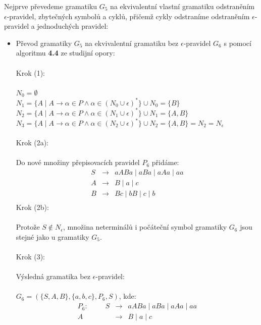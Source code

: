 \documentclass[a4paper,11pt]{article}[24.3.2010]
\begin{document}
\begin{enumerate}
Nejprve převedeme gramatiku  $G_{5}$ na ekvivalentní vlastní gramatiku odstraněním $\epsilon$-pravidel, zbytečných symbolů a cyklů, přičemž cykly odstraníme odstraněním $\epsilon$-pravidel a jednoduchých pravidel:
    \begin{itemize}
      \item Převod gramatiky $G_{5}$ na ekvivalentní gramatiku bez $\epsilon$-pravidel $G_{6}$ s pomocí algoritmu \textbf{4.4} ze studijní opory:\\\\
      Krok (1):\\\\
      $N_{0} = \emptyset$\\
      $N_{1} = \{A \mid A \rightarrow \alpha \in P \wedge \alpha \in (N_{0} \cup \epsilon)^{*}\} \cup N_{0} = \{B\}$\\
      $N_{2} = \{A \mid A \rightarrow \alpha \in P \wedge \alpha \in (N_{1} \cup \epsilon)^{*}\} \cup N_{1} = \{A,B\}$\\
      $N_{3} = \{A \mid A \rightarrow \alpha \in P \wedge \alpha \in (N_{2} \cup \epsilon)^{*}\} \cup N_{2} = \{A,B\} = N_{2} = N_{\epsilon}$\\\\
      Krok (2a): \\\\
      Do nové množiny přepisovacích pravidel $P_{6}$ přidáme:
      \begin{eqnarray*}
      S&\rightarrow&aABa \mid aBa \mid aAa \mid aa\\
      A&\rightarrow&B \mid a \mid c\\
      B&\rightarrow&Bc \mid bB \mid c \mid b\\
      \end{eqnarray*}
      Krok (2b): \\\\
      Protože $S \notin N_{\epsilon}$, množina neterminálů i počáteční symbol gramatiky $G_{6}$ jsou stejné jako u gramatiky $G_{5}$.\\\\
      Krok (3): \\\\
      Výsledná gramatika bez $\epsilon$-pravidel:\\\\ $G_{6} = (\{S,A,B\},\{a,b,c\},P_{6},S)$, kde:
      \begin{eqnarray*}
      P_{6}: \:\:\:\:\:\:\:\:\:\:\: S&\rightarrow&aABa \mid aBa \mid aAa \mid aa\\
      A&\rightarrow&B \mid a \mid c\\

\end{eqnarray*}
\end{itemize}
\end{enumerate}
\end{document}
